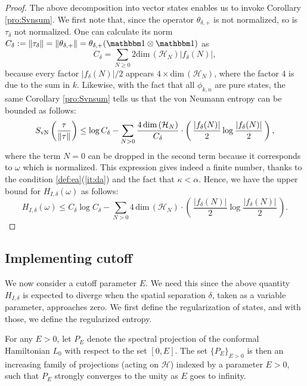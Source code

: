 \documentclass[a4paper,12pt]{article}
\theoremstyle{plain}
\theoremstyle{definition}
\theoremstyle{remark}
\newcommand{\Svn}{S_{\rm vN}}
\def\H{{\mathcal H}}
\def\dim{\mathrm{dim}\,}
\def\1{{\mathbbm 1}}
\begin{document}
\begin{proof}
  
The above decomposition into vector states enables us to invoke Corollary \ref{pro:Svnsum}.
We first note that, since the operator $\theta_{\delta,+}$ is not normalized, so is $\tau_\delta$ not normalized.
One can calculate its norm $C_\delta := \|\tau_\delta\| = \|\theta_{\delta,+}\| = \theta_{\delta,+}(\1\otimes \1)$ as
\[
C_\delta = \sum_{N\ge 0} 2 \dim(\H_N) |f_\delta(N)|,
\]
because every factor $|f_\delta(N)|/2$ appears $4\times\dim(\H_N)$, where the factor $4$ is due to the sum in $k$.
Likewise, with the fact that all $\phi_{k,n}$ are pure states, the same Corollary \ref{pro:Svnsum} tells us that the von Neumann entropy can be bounded as follows:
\[
\Svn\left(\frac{\tau}{\|\tau\|}\right) \le
\log C_\delta - \sum_{N > 0} \frac{4 \, \dim(\H_N)}{C_\delta} \cdot\left(\, \frac{|f_\delta(N)|}{2} \log \frac{|f_\delta(N)|}{2} \,\right),
\]
where the term $N = 0$ can be dropped in the second term because it corresponds to $\omega$ which is normalized.
This expression gives indeed a finite number, thanks to the condition \ref{def:ea}(\ref{it:da}) and the fact that $\kappa<\alpha$.
Hence, we have the upper bound for $H_{I,\delta}(\omega)$ as follows:
\[
  H_{I,\delta}(\omega) \le C_\delta\log C_\delta - \sum_{N > 0} 4 \, \dim(\H_N) \cdot\left(\, \frac{|f_\delta(N)|}{2} \log \frac{|f_\delta(N)|}{2} \,\right).
\]
\end{proof}

\subsection{Implementing cutoff}\label{subsec:cutoff}


We now consider a cutoff parameter $E$. We need this since the above quantity $H_{I,\delta}$ is expected to diverge when the spatial separation $\delta$,
taken as a variable parameter, approaches zero. %
We first define the regularization of states, and with those, we define the regularized entropy.

For any $E > 0$, let $P_E$ denote the spectral projection of the conformal Hamiltonian $L_0$
with respect to the set $[0, E]$. The set $\{P_E\}_{E > 0}$ is then an increasing family of projections
(acting on $\H$) indexed by a parameter $E > 0$, such that $P_E$ strongly converges to the unity as $E$ goes to infinity.
\end{document}
